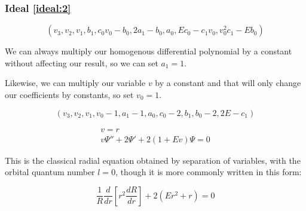 \documentclass{beamer}
\begin{document}
\begin{frame}
\frametitle{Ideal \eqref{ideal:2}}
\[ \left(v_{3}, v_{2}, v_{1}, b_{1}, c_{0} v_{0} - b_{0}, 2 a_{1} - b_{0}, a_{0}, E c_{0} - c_{1} v_{0}, v_0^2 c_1 - E b_0\right) \]


We can always multiply our homogenous differential polynomial by a constant without affecting our result, so we can set $a_1=1$.

Likewise, we can multiply our variable $v$ by a constant and that will only change our coefficients by constants,
so set $v_0=1$.

\begin{equation*}
\left(v_{3}, v_{2}, v_{1}, v_{0} - 1, a_{1} - 1, a_{0}, c_{0} - 2, b_{1}, b_{0} - 2, 2 E - c_{1}\right)
\end{equation*}

\begin{equation*}
\label{classical eq in ideal}
\begin{gathered}
v=r \\
v \Psi'' + 2 \Psi' + 2(1 + E v) \Psi = 0
\end{gathered}
\end{equation*}

This is the classical radial equation obtained by separation of variables,
with the orbital quantum number $l=0$,
though it is more commonly written in this form:

\begin{equation*}
\frac{1}{R} \frac{d}{dr}\left[ r^2 \frac{dR}{dr}\right] + 2(Er^2 + r) = 0
\end{equation*}
\end{frame}
\end{document}
